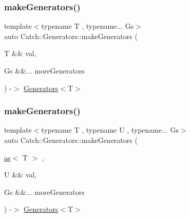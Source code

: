 \mbox{\label{namespace_catch_1_1_generators_ab22ab581e83e71530d8bbd1c14f94abc}} 
\subsubsection{\texorpdfstring{make\+Generators()}{makeGenerators()}\hspace{0.1cm}{\footnotesize\ttfamily [3/4]}}
{\footnotesize\ttfamily template$<$typename T , typename... Gs$>$ \\
auto Catch\+::\+Generators\+::make\+Generators (\begin{DoxyParamCaption}\item[{T \&\&}]{val,  }\item[{Gs \&\&...}]{more\+Generators }\end{DoxyParamCaption}) -\/$>$ \mbox{\hyperlink{class_catch_1_1_generators_1_1_generators}{Generators}}$<$T$>$ }

\mbox{\label{namespace_catch_1_1_generators_aac8c5682b95d3467b013de492f21e7e2}} 
\subsubsection{\texorpdfstring{make\+Generators()}{makeGenerators()}\hspace{0.1cm}{\footnotesize\ttfamily [4/4]}}
{\footnotesize\ttfamily template$<$typename T , typename U , typename... Gs$>$ \\
auto Catch\+::\+Generators\+::make\+Generators (\begin{DoxyParamCaption}\item[{\mbox{\hyperlink{struct_catch_1_1_generators_1_1as}{as}}$<$ T $>$}]{,  }\item[{U \&\&}]{val,  }\item[{Gs \&\&...}]{more\+Generators }\end{DoxyParamCaption}) -\/$>$ \mbox{\hyperlink{class_catch_1_1_generators_1_1_generators}{Generators}}$<$T$>$ }

\mbox{\label{namespace_catch_1_1_generators_af33fd06c51ac9173c3bee2ddee2559a6}} 
